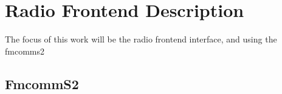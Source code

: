 \chapter{Radio Frontend Description}
The focus of this work will be the radio frontend interface, and using the 
fmcomms2 

\section{FmcommS2}


